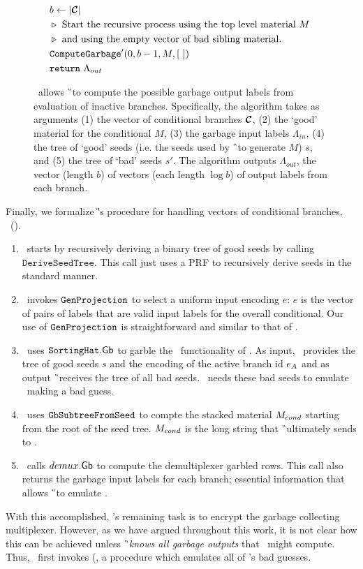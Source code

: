 \begin{figure}
\begin{align*}
    \\
    &~~b \gets |\vec{\cir}|\\
    &~~\codecomment{Start the recursive process using the top level material $\mat$}\\
    &~~\codecomment{and using the empty vector of bad sibling material.}\\
    &~~\computegarbage'(0, b-1, \mat, [~])\\
    &~~\creturn~\Lambda_{out}
  \end{align*}
  \caption{%
    \computegarbage\ allows \G\ to compute the possible garbage output labels
    from evaluation of inactive branches.
    Specifically, the algorithm takes as arguments (1) the vector of
    conditional branches $\vec{\cir}$, (2) the `good' material for the
    conditional $M$, (3) the garbage input labels $\Lambda_{in}$, (4)
    the tree of `good' seeds (i.e. the seeds used by \G\ to generate
    $M$) $s$, and (5) the tree of `bad' seeds $s'$.
    The algorithm outputs $\Lambda_{out}$, the vector (length $b$) of
    vectors (each length $\log b$) of output labels from each
    branch.
  }\label{fig:computegarbage}
\end{figure}

Finally, we formalize \G's procedure for handling vectors of
conditional branches, \gbcond~().
%
\begin{enumerate}
  \item \gbcond\ starts by recursively deriving a binary tree of
good seeds by calling $\mathtt{DeriveSeedTree}$. This call just uses a PRF
to recursively derive seeds in the standard manner.
%
\item \gbcond\ invokes $\mathtt{GenProjection}$ to select a uniform input
encoding $e$: $e$ is the vector of pairs of labels that are
valid input labels for the overall conditional.
Our use of $\mathtt{GenProjection}$ is straightforward and similar to that of
\HK.
%
\item \gbcond\ uses $\mathtt{SortingHat}.\textsf{Gb}$ to garble the \gadget\
  functionality of .
  As input, \gbcond\ provides the tree of good seeds $s$ and the encoding
  of the active branch id $e_{A}$ and as output \G\ receives the tree
  of all bad seeds.
  \gbcond\ needs these bad seeds to emulate \E\ making a bad guess.
%
\item \gbcond\ uses $\mathtt{GbSubtreeFromSeed}$ to compte the stacked material
$M_{cond}$ starting from the root of the seed tree.
$M_{cond}$ is the long string that \G\ ultimately sends to \E.
%
\item \gbcond\ calls $demux.\textsf{Gb}$ to compute the demultiplexer garbled
  rows.  This call also returns the garbage input labels for each
  branch; essential information that allows \G\ to emulate \E.
\end{enumerate}
With this accomplished, \gbcond's remaining task is to encrypt the
garbage collecting multiplexer.
However, as we have argued throughout this work, it is not clear how
this can be achieved unless \G\ \emph{knows all garbage outputs} that
\E\ might compute.
%
Thus, \gbcond\ first invokes \computegarbage
(, a procedure which
emulates all of \E's bad guesses.

